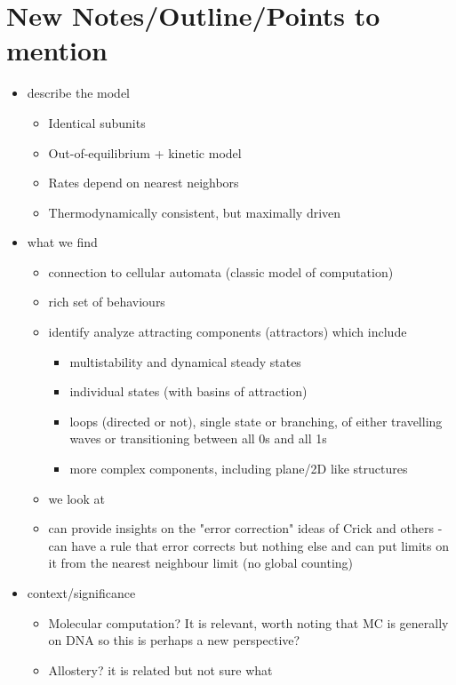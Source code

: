 \documentclass[11pt]{article}
\begin{document}

\vspace{3em}
\section{New Notes/Outline/Points to mention}
\begin{itemize}
	\item describe the model
	      \begin{itemize}
		      \item Identical subunits
		      \item Out-of-equilibrium + kinetic model
		      \item Rates depend on nearest neighbors
		      \item Thermodynamically consistent, but maximally driven
	      \end{itemize}
	\item what we find
	      \begin{itemize}
		      \item connection to cellular automata (classic model of computation)
		      \item rich set of behaviours
		      \item identify analyze attracting components (attractors) which include
		            \begin{itemize}
			            \item multistability and dynamical steady states
			            \item individual states (with basins of attraction)
			            \item loops (directed or not), single state or branching, of either travelling waves or transitioning between all 0s and all 1s
			            \item more complex components, including plane/2D like structures
		            \end{itemize}
		      \item we look at
		      \item can provide insights on the "error correction" ideas of Crick and others - can have a rule that error corrects but nothing else and can put limits on it from the nearest neighbour limit (no global counting)
	      \end{itemize}
	\item context/significance
	      \begin{itemize}
		      \item Molecular computation? It is relevant, worth noting that MC is generally on DNA so this is perhaps a new perspective?
		      \item Allostery? it is related but not sure what
	      \end{itemize}
\end{itemize}
\end{document}
